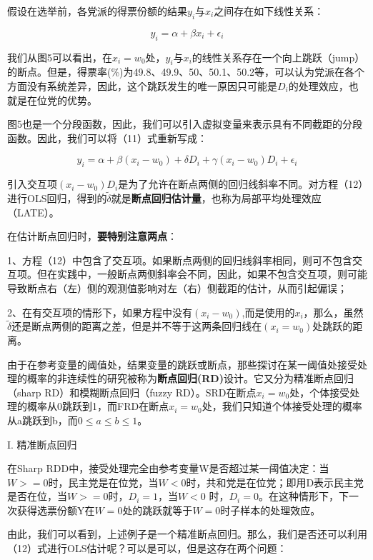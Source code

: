 \documentclass[cn,12pt,math=newtx,citestyle=gb7714-2015,bibstyle=gb7714-2015]{elegantbook}
\begin{document}
	假设在选举前，各党派的得票份额的结果$y_i$与$x_i$之间存在如下线性关系：
	
	\begin{equation}
		y_i=\alpha+\beta{x_i}+\epsilon_i
	\end{equation}
	
	我们从图5可以看出，在$x_i=w_0$处，$y_i$与$x_i$的线性关系存在一个向上跳跃（jump）的断点。但是，得票率(\%)为49.8、49.9、50、50.1、50.2等，可以认为党派在各个方面没有系统差异，因此，这个跳跃发生的唯一原因只可能是$D_i$的处理效应，也就是在位党的优势。
	
	图5也是一个分段函数，因此，我们可以引入虚拟变量来表示具有不同截距的分段函数。因此，我们可以将（11）式重新写成：
	
	\begin{equation}
		y_i=\alpha+\beta{(x_i-w_0)}+\delta{D_i}+\gamma{(x_i-w_0)D_i}+\epsilon_i
	\end{equation}
	
	引入交互项$(x_i-w_0)D_i$是为了允许在断点两侧的回归线斜率不同。对方程（12）进行OLS回归，得到的$\tilde{\delta}$就是\textbf{断点回归估计量}，也称为局部平均处理效应（LATE）。
	
	在估计断点回归时，\textbf{要特别注意两点}：
	
	1、方程（12）中包含了交互项。如果断点两侧的回归线斜率相同，则可不包含交互项。但在实践中，一般断点两侧斜率会不同，因此，如果不包含交互项，则可能导致断点右（左）侧的观测值影响对左（右）侧截距的估计，从而引起偏误；
	
	2、在有交互项的情形下，如果方程中没有$(x_i-w_0)$,而是使用的$x_i$，那么，虽然$\tilde{\delta}$还是断点两侧的距离之差，但是并不等于这两条回归线在$(x_i=w_0)$处跳跃的距离。
	
	由于在参考变量的阈值处，结果变量的跳跃或断点，那些探讨在某一阈值处接受处理的概率的非连续性的研究被称为\textbf{断点回归(RD)}设计。它又分为精准断点回归（sharp RD）和模糊断点回归（fuzzy RD）。SRD在断点$x_i=w_0$处，个体接受处理的概率从0跳跃到1，而FRD在断点$x_i=w_0$处，我们只知道个体接受处理的概率从a跳跃到b，而$0\le{a}\le{b}\le{1}$。
	
	I. 精准断点回归
	
	在Sharp RDD中，接受处理完全由参考变量W是否超过某一阈值决定：当$W>=0$时，民主党是在位党，当$W<0$时，共和党是在位党；即用D表示民主党是否在位，当$W>=0$时，$D_i=1$，当$W<0$ 时，$D_i=0$。在这种情形下，下一次获得选票份额Y在$W=0$处的跳跃就等于$W=0$时子样本的处理效应。
	
	由此，我们可以看到，上述例子是一个精准断点回归。那么，我们是否还可以利用（12）式进行OLS估计呢？可以是可以，但是这存在两个问题：
	
\end{document}
